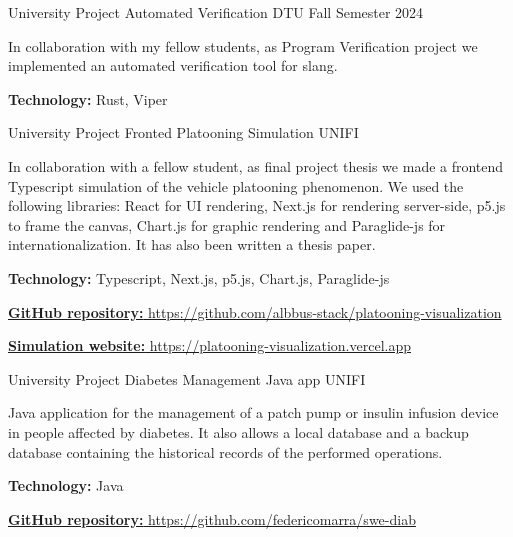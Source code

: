 \begin{cventries}
  \cventry
    {University Project} %
    {Automated Verification} %
    {DTU} %
    {Fall Semester 2024} %
    {
      \begin{cvitems} %
        \item {In collaboration with my fellow students, as Program Verification project we implemented an automated verification tool for slang.}
        \item {\textbf{Technology:} Rust, Viper}
      \end{cvitems}
    }

  \cventry
    {University Project} %
    {Fronted Platooning Simulation} %
    {UNIFI} %
    {} %
    {
      \begin{cvitems} %
        \item {In collaboration with a fellow student, as final project thesis we made a frontend Typescript simulation of the vehicle platooning phenomenon. We used the following libraries: React for UI rendering, Next.js for rendering server-side, p5.js to frame the canvas, Chart.js for graphic rendering and Paraglide-js for internationalization. It has also been written a thesis paper.}
        \item {\textbf{Technology:} Typescript, Next.js, p5.js, Chart.js, Paraglide-js}
        \item {\href{https://github.com/albbus-stack/platooning-visualization}{\textbf{GitHub repository:} https://github.com/albbus-stack/platooning-visualization}}
        \item {\href{https://platooning-visualization.vercel.app}{\textbf{Simulation website:} https://platooning-visualization.vercel.app}}
      \end{cvitems}
    }

  \cventry
    {University Project} %
    {Diabetes Management Java app} %
    {UNIFI} %
    {} %
    {
      \begin{cvitems} %
        \item {Java application for the management of a patch pump or insulin infusion device in people affected by diabetes. It also allows a local database and a backup database containing the historical records of the performed operations.}
        \item {\textbf{Technology:} Java}
        \item {\href{https://github.com/federicomarra/swe-diab}{\textbf{GitHub repository:} https://github.com/federicomarra/swe-diab}}
      \end{cvitems}
    }
    

\end{cventries}
